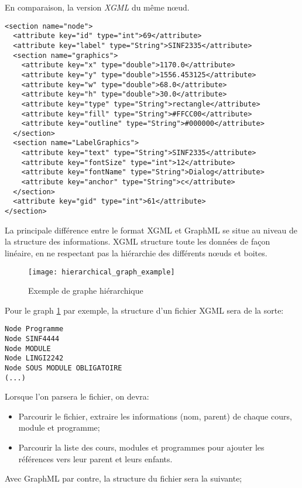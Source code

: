 En comparaison, la version \textit{XGML} du même nœud.
\begin{lstlisting}
<section name="node">
  <attribute key="id" type="int">69</attribute>
  <attribute key="label" type="String">SINF2335</attribute>
  <section name="graphics">
    <attribute key="x" type="double">1170.0</attribute>
    <attribute key="y" type="double">1556.453125</attribute>
    <attribute key="w" type="double">68.0</attribute>
    <attribute key="h" type="double">30.0</attribute>
    <attribute key="type" type="String">rectangle</attribute>
    <attribute key="fill" type="String">#FFCC00</attribute>
    <attribute key="outline" type="String">#000000</attribute>
  </section>
  <section name="LabelGraphics">
    <attribute key="text" type="String">SINF2335</attribute>
    <attribute key="fontSize" type="int">12</attribute>
    <attribute key="fontName" type="String">Dialog</attribute>
    <attribute key="anchor" type="String">c</attribute>
  </section>
  <attribute key="gid" type="int">61</attribute>
</section>
\end{lstlisting}

La principale différence entre le format XGML et GraphML se situe au niveau de la structure des informations. XGML structure toute les données de façon linéaire, en ne respectant pas la hiérarchie des différents nœuds et boites.

\begin{figure}
\centering
\caption{Exemple de graphe hiérarchique} 
\label{fig:hierarchical_graph_example}
\texttt{[image: hierarchical\_graph\_example]}
\end{figure}

Pour le graph \ref{fig:hierarchical_graph_example} par exemple, la structure d'un fichier XGML sera de la sorte:
\begin{lstlisting}
Node Programme
Node SINF4444
Node MODULE
Node LINGI2242
Node SOUS MODULE OBLIGATOIRE
(...)
\end{lstlisting}

Lorsque l'on parsera le fichier, on devra:
\begin{itemize}
  \item Parcourir le fichier, extraire les informations (nom, parent) de chaque cours, module et programme;
  \item Parcourir la liste des cours, modules et programmes pour ajouter les références vers leur parent et leurs enfants.
\end{itemize} 

Avec GraphML par contre, la structure  du fichier sera la suivante;

